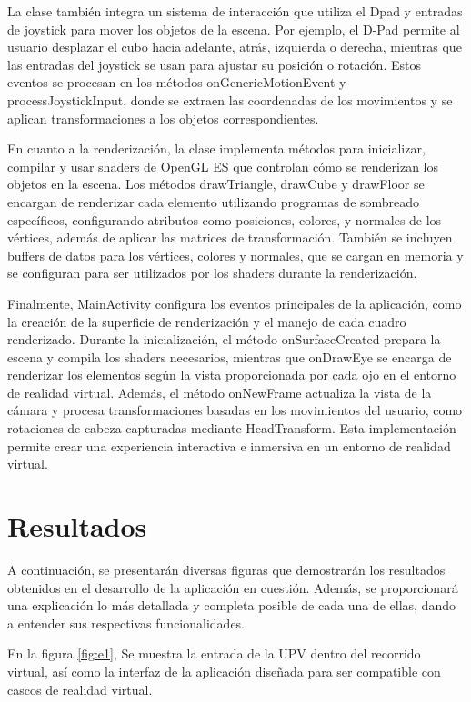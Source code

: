 \documentclass[conference]{IEEEtran}
\begin{document}
La clase también integra un sistema de interacción que utiliza el Dpad y entradas de joystick para mover los objetos de la escena. Por ejemplo, el D-Pad permite al usuario desplazar el cubo hacia adelante, atrás, izquierda o derecha, mientras que las entradas del joystick se usan para ajustar su posición o rotación. Estos eventos se procesan en los métodos onGenericMotionEvent y processJoystickInput, donde se extraen las coordenadas de los movimientos y se aplican transformaciones a los objetos correspondientes.

En cuanto a la renderización, la clase implementa métodos para inicializar, compilar y usar shaders de OpenGL ES que controlan cómo se renderizan los objetos en la escena. Los métodos drawTriangle, drawCube y drawFloor se encargan de renderizar cada elemento utilizando programas de sombreado específicos, configurando atributos como posiciones, colores, y normales de los vértices, además de aplicar las matrices de transformación. También se incluyen buffers de datos para los vértices, colores y normales, que se cargan en memoria y se configuran para ser utilizados por los shaders durante la renderización.

Finalmente, MainActivity configura los eventos principales de la aplicación, como la creación de la superficie de renderización y el manejo de cada cuadro renderizado. Durante la inicialización, el método onSurfaceCreated prepara la escena y compila los shaders necesarios, mientras que onDrawEye se encarga de renderizar los elementos según la vista proporcionada por cada ojo en el entorno de realidad virtual. Además, el método onNewFrame actualiza la vista de la cámara y procesa transformaciones basadas en los movimientos del usuario, como rotaciones de cabeza capturadas mediante HeadTransform. Esta implementación permite crear una experiencia interactiva e inmersiva en un entorno de realidad virtual.


\section{Resultados}
A continuación, se presentarán diversas figuras que demostrarán 
los resultados obtenidos en el desarrollo de la aplicación en cuestión. Además, se proporcionará una explicación lo más detallada y completa posible de cada una de ellas, dando a entender sus respectivas funcionalidades.


En la figura \ref{fig:e1}, Se muestra la entrada de la UPV dentro del recorrido virtual, así como la interfaz de la aplicación diseñada para ser compatible con cascos de realidad virtual.
\end{document}
